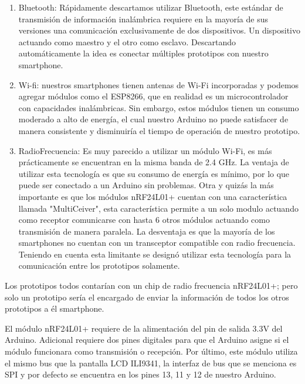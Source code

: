 \begin{enumerate}
	\item Bluetooth: Rápidamente descartamos utilizar Bluetooth, este estándar de transmisión de información inalámbrica requiere en la mayoría de sus versiones una comunicación exclusivamente de dos dispositivos. Un dispositivo actuando como maestro y el otro como esclavo. Descartando automáticamente la idea es conectar múltiples prototipos con nuestro smartphone. 
	
	\item Wi-fi: nuestros smartphones tienen antenas de Wi-Fi incorporadas y podemos agregar módulos como el ESP8266, que en realidad es un microcontrolador con capacidades inalámbricas. Sin embargo, estos módulos tienen un consumo moderado a alto de energía, el cual nuestro Arduino no puede satisfacer de manera consistente y disminuiría el tiempo de operación de nuestro prototipo.
	
	
	\item RadioFrecuencia: Es muy parecido a utilizar un módulo Wi-Fi, es más prácticamente se encuentran en la misma banda de 2.4 GHz. La ventaja de utilizar esta tecnología es que su consumo de energía es mínimo, por lo que puede ser conectado a un Arduino sin problemas. Otra y quizás la más importante es que los módulos nRF24L01+ cuentan con una característica llamada "MultiCeiver", esta característica permite a un solo modulo actuando como receptor comunicarse con hasta 6 otros módulos actuando como transmisión de manera paralela.  La desventaja es que la mayoría de los smartphones no cuentan con un transceptor compatible con radio frecuencia. Teniendo en cuenta esta limitante se designó utilizar esta tecnología para la comunicación entre los prototipos solamente. 
\end{enumerate} 

\par \noindent
Los prototipos todos contarían con un chip de radio frecuencia nRF24L01+; pero solo un prototipo sería el encargado de enviar la información de todos los otros prototipos a él smartphone. 

\par \noindent
El módulo nRF24L01+ requiere de la alimentación del pin de salida 3.3V del Arduino. Adicional requiere dos pines digitales para que el Arduino asigne si el módulo funcionara como transmisión o recepción. Por último, este módulo utiliza el mismo bus que la pantalla LCD ILI9341, la interfaz de bus que se menciona es SPI y por defecto se encuentra en los pines 13, 11 y 12 de nuestro Arduino. 

